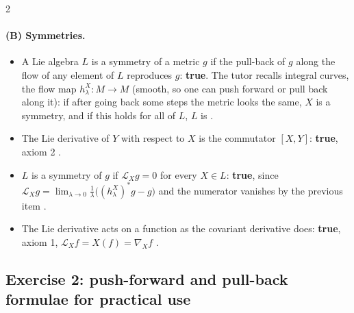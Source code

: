 \begin{paracol}{2}
\paragraph{(B) Symmetries.}
\begin{itemize}
  \item A Lie algebra $L$ is a symmetry of a metric $g$ if the pull-back of $g$ along the flow of any element of $L$ reproduces $g$: \textbf{true}. The tutor recalls integral curves, the flow map $h^X_\lambda\colon M\to M$ (smooth, so one can push forward or pull back along it): if after going back some steps the metric looks the same, $X$ is a symmetry, and if this holds for all of $L$, $L$ is .
  \item The Lie derivative of $Y$ with respect to $X$ is the commutator $[X,Y]$: \textbf{true}, axiom 2 .
  \item $L$ is a symmetry of $g$ if $\mathcal L_Xg=0$ for every $X\in L$: \textbf{true}, since $\mathcal L_Xg=\lim_{\lambda\to0}\frac1\lambda\bigl((h^X_\lambda)^*g-g\bigr)$ and the numerator vanishes by the previous item .
  \item The Lie derivative acts on a function as the covariant derivative does: \textbf{true}, axiom 1, $\mathcal L_Xf=X(f)=\nabla_Xf$ .
\end{itemize}

\subsection*{Exercise 2: push-forward and pull-back formulae for practical use}


\end{paracol}
